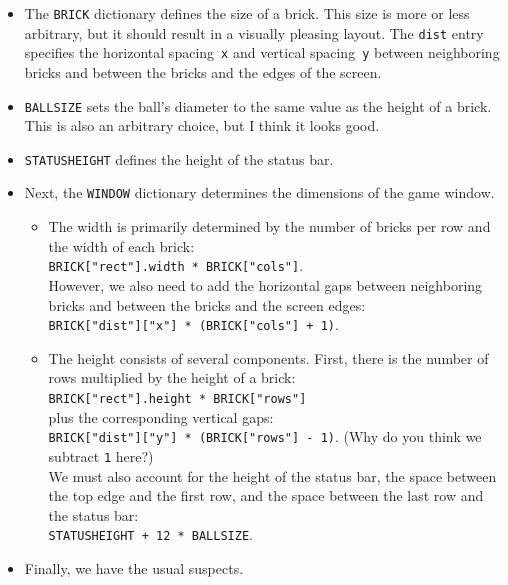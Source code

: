 \begin{itemize}
	\item The \texttt{BRICK} dictionary defines the size of a brick. This size is more or less arbitrary, but it should result in a visually pleasing layout. The \texttt{dist} entry specifies the horizontal spacing~\texttt{x} and vertical spacing~\texttt{y} between neighboring bricks and between the bricks and the edges of the screen.
	
	\item \texttt{BALLSIZE} sets the ball's diameter to the same value as the height of a brick. This is also an arbitrary choice, but I think it looks good.
	
	\item \texttt{STATUSHEIGHT} defines the height of the status bar.
	
	\item Next, the \texttt{WINDOW} dictionary determines the dimensions of the game window.
	\begin{itemize}
		\item The width is primarily determined by the number of bricks per row and the width of each brick:
		\\
		\verb=BRICK["rect"].width * BRICK["cols"]=.
		\\
		However, we also need to add the horizontal gaps between neighboring bricks and between the bricks and the screen edges:
		\\
		\verb=BRICK["dist"]["x"] * (BRICK["cols"] + 1)=.
		
		\item The height consists of several components. First, there is the number of rows multiplied by the height of a brick:
		\\
		\verb=BRICK["rect"].height * BRICK["rows"]=
		\\
		plus the corresponding vertical gaps:
		\\
		\verb=BRICK["dist"]["y"] * (BRICK["rows"] - 1)=.
		(Why do you think we subtract \texttt{1} here?)
		\\
		We must also account for the height of the status bar, the space between the top edge and the first row, and the space between the last row and the status bar:
		\\
		\verb=STATUSHEIGHT + 12 * BALLSIZE=.
	\end{itemize}
	
	\item Finally, we have the usual suspects.
\end{itemize}


